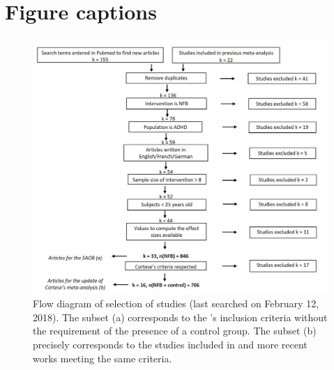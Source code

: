 \section*{Figure captions}

\begin{figure}[h!]
  \centering
	\includegraphics[width=1.0\linewidth]{figures/meta_review_factors_analysis_how_studies_are_included_no_colors_2-columns_fitting_ima.jpg} 
  \caption{Flow diagram of selection of studies (last searched on February 12, 2018).  
	The subset (a) corresponds to the \citeauthor{Cortese2016}'s inclusion criteria without the requirement of 
	the presence of a control group.
	The subset (b) precisely corresponds to the studies included in \citet{Cortese2016} and more recent works meeting the same criteria.}
  \label{Figure:systematic_review_workflow}
\end{figure}

